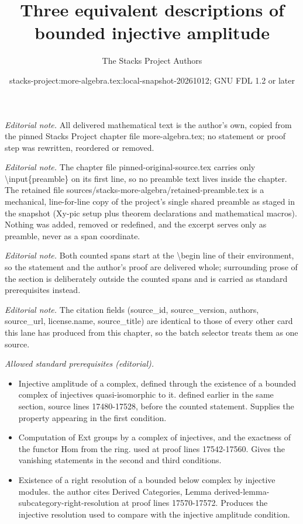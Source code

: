 \documentclass[10pt,a4paper]{amsart}
\title{Three equivalent descriptions of bounded injective amplitude}
\author{The Stacks Project Authors}
\date{stacks-project:more-algebra.tex:local-snapshot-20261012; GNU FDL 1.2 or later}
\theoremstyle{plain}
\theoremstyle{definition}
\theoremstyle{remark}
\numberwithin{equation}{subsection}
\begin{document}
\maketitle
\setcounter{subsection}{1}
\noindent\textit{Editorial note.} All delivered mathematical text is the author's own, copied from the pinned Stacks Project chapter file more-algebra.tex; no statement or proof step was rewritten, reordered or removed.\par\medskip
\noindent\textit{Editorial note.} The chapter file pinned-original-source.tex carries only \textbackslash{}input\{preamble\} on its first line, so no preamble text lives inside the chapter. The retained file sources/stacks-more-algebra/retained-preamble.tex is a mechanical, line-for-line copy of the project's single shared preamble as staged in the snapshot (Xy-pic setup plus theorem declarations and mathematical macros). Nothing was added, removed or redefined, and the excerpt serves only as preamble, never as a span coordinate.\par\medskip
\noindent\textit{Editorial note.} Both counted spans start at the \textbackslash{}begin line of their environment, so the statement and the author's proof are delivered whole; surrounding prose of the section is deliberately outside the counted spans and is carried as standard prerequisites instead.\par\medskip
\noindent\textit{Editorial note.} The citation fields (source\_id, source\_version, authors, source\_url, license.name, source\_title) are identical to those of every other card this lane has produced from this chapter, so the batch selector treats them as one source.\par\medskip
\noindent\textit{Allowed standard prerequisites (editorial).}\begin{itemize}
\item Injective amplitude of a complex, defined through the existence of a bounded complex of injectives quasi-isomorphic to it. defined earlier in the same section, source lines 17480-17528, before the counted statement. Supplies the property appearing in the first condition.
\item Computation of Ext groups by a complex of injectives, and the exactness of the functor Hom from the ring. used at proof lines 17542-17560. Gives the vanishing statements in the second and third conditions.
\item Existence of a right resolution of a bounded below complex by injective modules. the author cites Derived Categories, Lemma derived-lemma-subcategory-right-resolution at proof lines 17570-17572. Produces the injective resolution used to compare with the injective amplitude condition.
\end{itemize}\medskip
\end{document}
